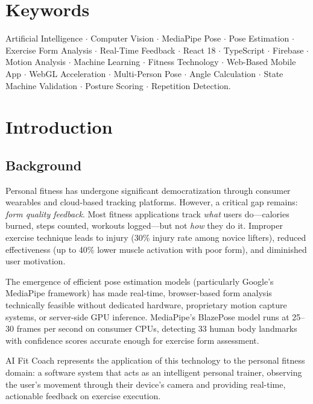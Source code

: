 \documentclass[12pt,a4paper]{article}
\begin{document}
\section{Keywords}

Artificial Intelligence $\cdot$ Computer Vision $\cdot$ MediaPipe Pose $\cdot$
Pose Estimation $\cdot$ Exercise Form Analysis $\cdot$ Real-Time Feedback $\cdot$
React 18 $\cdot$ TypeScript $\cdot$ Firebase $\cdot$ Motion Analysis $\cdot$
Machine Learning $\cdot$ Fitness Technology $\cdot$ Web-Based Mobile App $\cdot$
WebGL Acceleration $\cdot$ Multi-Person Pose $\cdot$ Angle Calculation $\cdot$
State Machine Validation $\cdot$ Posture Scoring $\cdot$ Repetition Detection.

\section{Introduction}

\subsection{Background}

Personal fitness has undergone significant democratization through consumer
wearables and cloud-based tracking platforms. However, a critical gap remains: 
\textit{form quality feedback}. Most fitness applications track \textit{what} 
users do---calories burned, steps counted, workouts logged---but not \textit{how} 
they do it. Improper exercise technique leads to injury (30\% injury rate among 
novice lifters), reduced effectiveness (up to 40\% lower muscle activation with 
poor form), and diminished user motivation.

The emergence of efficient pose estimation models (particularly Google's 
MediaPipe framework) has made real-time, browser-based form analysis 
technically feasible without dedicated hardware, proprietary motion capture 
systems, or server-side GPU inference. MediaPipe's BlazePose model runs at 
25--30 frames per second on consumer CPUs, detecting 33 human body landmarks 
with confidence scores accurate enough for exercise form assessment.

AI Fit Coach represents the application of this technology to the personal 
fitness domain: a software system that acts as an intelligent personal trainer, 
observing the user's movement through their device's camera and providing 
real-time, actionable feedback on exercise execution.
\end{document}
